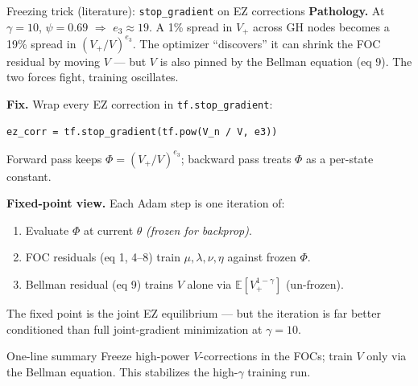 \documentclass[aspectratio=169,11pt]{beamer}
\newcommand{\emphc}[1]{\textcolor{harvardcrimson}{#1}}
\begin{document}
\begin{frame}{Freezing trick (literature): \texttt{stop\_gradient} on EZ corrections}
\footnotesize
\textbf{Pathology.} At $\gamma = 10$, $\psi = 0.69$ $\Rightarrow$ $e_3 \approx 19$. A 1\% spread in $V_+$ across GH nodes becomes a 19\% spread in $(V_+/V)^{e_3}$. The optimizer ``discovers'' it can shrink the FOC residual by moving $V$ --- but $V$ is also pinned by the Bellman equation (eq 9). The two forces fight, training oscillates.

\textbf{Fix.} Wrap every EZ correction in \texttt{tf.stop\_gradient}:
\begin{center}
\texttt{ez\_corr = tf.stop\_gradient(tf.pow(V\_n / V, e3))}
\end{center}
Forward pass keeps $\Phi = (V_+/V)^{e_3}$; backward pass treats $\Phi$ as a per-state \emphc{constant}.

\textbf{Fixed-point view.} Each Adam step is one iteration of:
\begin{enumerate}\setlength\itemsep{0pt}
    \item Evaluate $\Phi$ at current $\theta$ \emph{(frozen for backprop)}.
    \item FOC residuals (eq 1, 4--8) train $\mu, \lambda, \nu, \eta$ against frozen $\Phi$.
    \item Bellman residual (eq 9) trains $V$ alone via $\mathbb{E}[V_+^{1-\gamma}]$ (un-frozen).
\end{enumerate}
The fixed point is the joint EZ equilibrium --- but the iteration is far better conditioned than full joint-gradient minimization at $\gamma = 10$.

\begin{alertblock}{One-line summary}
Freeze high-power $V$-corrections in the FOCs; train $V$ \emphc{only} via the Bellman equation. This stabilizes the high-$\gamma$ training run.
\end{alertblock}
\end{frame}
\end{document}

